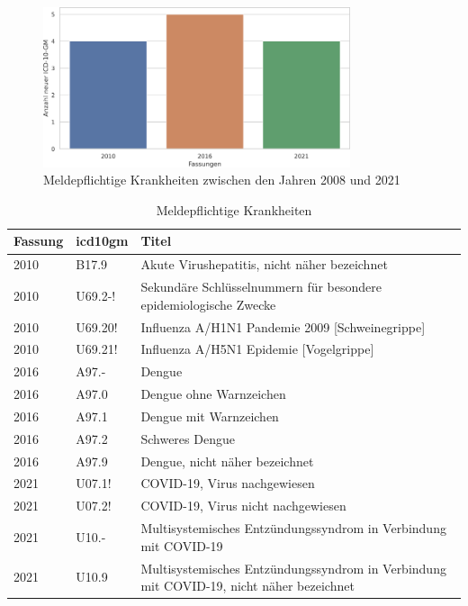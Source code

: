 \begin{figure}[ht]
	\centering
	\includegraphics[height=4.7cm]{figures/arztJaYear}
	\caption[Meldepflichtige \acs{icd10gm} pro Jahr]{Meldepflichtige Krankheiten zwischen den Jahren 2008 und 2021}
	\label{fig:newicdmeld}
\end{figure} 

\clearpage
\begin{table}[ht]
	\centering
	\small
	\caption[Meldepflichtige \acs{icd10gm}]{Meldepflichtige Krankheiten}
	\label{tab:meldung}
	\begin{tabular}{|l|l|p{10.5cm}|}
		\hline
		\rowcolor{lightgray} Fassung & \acs{icd10gm} & Titel \\ \hline
		2010 & B17.9 & Akute Virushepatitis, nicht näher bezeichnet \\ \hline
		2010 & U69.2-! & Sekundäre Schlüsselnummern für besondere epidemiologische Zwecke \\ \hline
		2010 & U69.20! & Influenza A/H1N1 Pandemie 2009 [Schweinegrippe] \\ \hline
		2010 & U69.21! & Influenza A/H5N1 Epidemie [Vogelgrippe] \\ \hline
		2016 & A97.- & Dengue \\ \hline
		2016 & A97.0 & Dengue ohne Warnzeichen \\ \hline
		2016 & A97.1 & Dengue mit Warnzeichen \\ \hline
		2016 & A97.2 & Schweres Dengue \\ \hline
		2016 & A97.9 & Dengue, nicht näher bezeichnet \\ \hline
		2021 & U07.1! & COVID-19, Virus nachgewiesen \\ \hline
		2021 & U07.2! & COVID-19, Virus nicht nachgewiesen \\ \hline
		2021 & U10.- & Multisystemisches Entzündungssyndrom in Verbindung mit COVID-19 \\ \hline
		2021 & U10.9 & Multisystemisches Entzündungssyndrom in Verbindung mit COVID-19, nicht näher bezeichnet \\ \hline
	\end{tabular}
\end{table}

